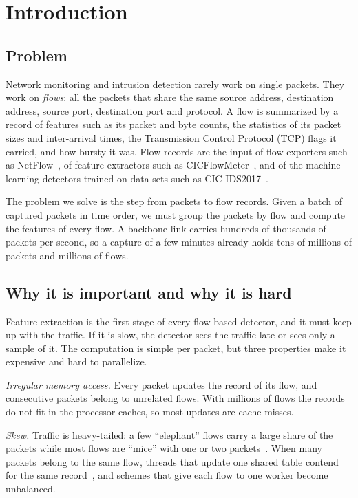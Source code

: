\section{Introduction}

\subsection{Problem}
Network monitoring and intrusion detection rarely work on single packets. They
work on \emph{flows}: all the packets that share the same source address,
destination address, source port, destination port and protocol. A flow is
summarized by a record of features such as its packet and byte counts, the
statistics of its packet sizes and inter-arrival times, the Transmission Control
Protocol (TCP) flags it carried, and how bursty it was. Flow records are the
input of flow exporters such as NetFlow~\cite{netflow}, of feature extractors
such as CICFlowMeter~\cite{cicflowmeter}, and of the machine-learning detectors
trained on data sets such as CIC-IDS2017~\cite{cicids}.

The problem we solve is the step from packets to flow records. Given a batch of
captured packets in time order, we must group the packets by flow and compute
the features of every flow. A backbone link carries hundreds of thousands of
packets per second, so a capture of a few minutes already holds tens of
millions of packets and millions of flows.

\subsection{Why it is important and why it is hard}
Feature extraction is the first stage of every flow-based detector, and it
must keep up with the traffic. If it is slow, the detector sees the traffic
late or sees only a sample of it. The computation is simple per packet, but
three properties make it expensive and hard to parallelize.

\emph{Irregular memory access.} Every packet updates the record of its flow,
and consecutive packets belong to unrelated flows. With millions of flows the
records do not fit in the processor caches, so most updates are cache misses.

\emph{Skew.} Traffic is heavy-tailed: a few ``elephant'' flows carry a large
share of the packets while most flows are ``mice'' with one or two
packets~\cite{elephants}. When many packets belong to the same flow, threads
that update one shared table contend for the same record~\cite{cieslewicz}, and
schemes that give each flow to one worker become unbalanced.

